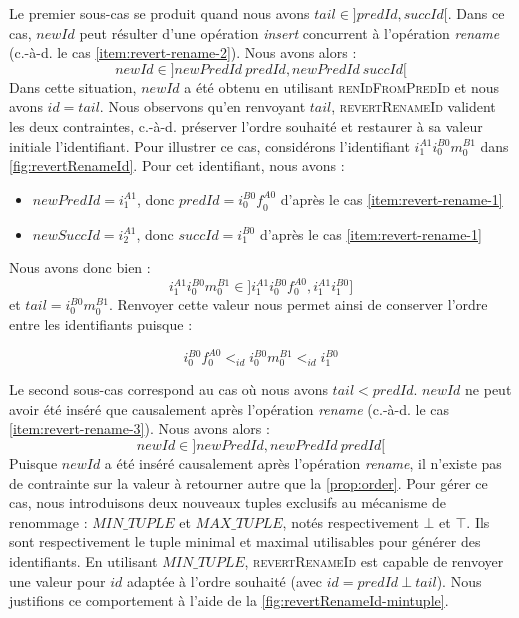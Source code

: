 \documentclass[12pt]{thesul}
\newcommand{\ie}{c.-à-d. }
\newcommand{\trm}[1]{\mathit{#1}}
\newcommand{\id}[3]{$\trm{#1}^{\trm{#2}}_{\trm{#3}}$}
\begin{document}
Le premier sous-cas se produit quand nous avons $\trm{tail} \in ]\trm{predId}, \trm{succId}[$.
Dans ce cas, $\trm{newId}$ peut résulter d'une opération \emph{insert} concurrent à l'opération \emph{rename} (\ie le cas \ref{item:revert-rename-2}).
Nous avons alors :
\[\trm{newId} \in ]\trm{newPredId~predId}, \trm{newPredId~succId}[\]
Dans cette situation, $\trm{newId}$ a été obtenu en utilisant \textsc{renIdFromPredId} et nous avons $\trm{id} = \trm{tail}$.
Nous observons qu'en renvoyant $\trm{tail}$, \textsc{revertRenameId} valident les deux contraintes, \ie préserver l'ordre souhaité et restaurer à sa valeur initiale l'identifiant.
Pour illustrer ce cas, considérons l'identifiant \id{i}{A1}{1}\id{i}{B0}{0}\id{m}{B1}{0} dans \autoref{fig:revertRenameId}.
Pour cet identifiant, nous avons :
\begin{itemize}
  \item $newPredId = $\id{i}{A1}{1}, donc $predId = $\id{i}{B0}{0}\id{f}{A0}{0} d'après le cas \ref{item:revert-rename-1}
  \item $newSuccId = $\id{i}{A1}{2}, donc $succId = $\id{i}{B0}{1} d'après le cas \ref{item:revert-rename-1}
\end{itemize}
Nous avons donc bien :
\[i^{A1}_{1}i^{B0}_{0}m^{B1}_{0} \in ]i^{A1}_{1}i^{B0}_{0}f^{A0}_{0}, i^{A1}_{1}i^{B0}_{1}]\]
et $tail = $\id{i}{B0}{0}\id{m}{B1}{0}.
Renvoyer cette valeur nous permet ainsi de conserver l'ordre entre les identifiants puisque :

\[i^{B0}_{0}f^{A0}_{0} <_{id} i^{B0}_{0}m^{B1}_{0} <_{id} i^{B0}_{1}\]

Le second sous-cas correspond au cas où nous avons $\trm{tail} < \trm{predId}$.
$\trm{newId}$ ne peut avoir été inséré que causalement après l'opération \emph{rename} (\ie le cas \ref{item:revert-rename-3}).
Nous avons alors :
\[\trm{newId} \in ]\trm{newPredId}, \trm{newPredId~predId}[\]
Puisque $\trm{newId}$ a été inséré causalement après l'opération \emph{rename}, il n'existe pas de contrainte sur la valeur à retourner autre que la \autoref{prop:order}.
Pour gérer ce cas, nous introduisons deux nouveaux tuples exclusifs au mécanisme de renommage : $\trm{MIN\_TUPLE}$ et $\trm{MAX\_TUPLE}$, notés respectivement $\bot$ et $\top$.
Ils sont respectivement le tuple minimal et maximal utilisables pour générer des identifiants.
En utilisant $\trm{MIN\_TUPLE}$, \textsc{revertRenameId} est capable de renvoyer une valeur pour $\trm{id}$ adaptée à l'ordre souhaité (avec $\trm{id} = \trm{predId~\bot~tail}$).
Nous justifions ce comportement à l'aide de la \autoref{fig:revertRenameId-mintuple}.
\end{document}
